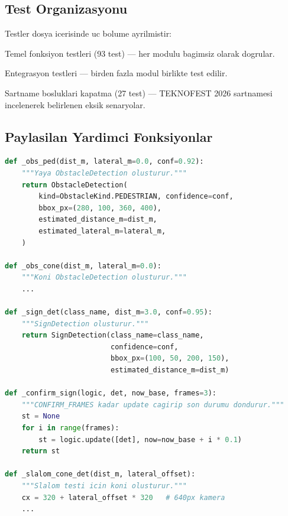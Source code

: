 \documentclass[a4paper,12pt]{article}
\begin{document}
\subsection{Test Organizasyonu}

Testler dosya icerisinde uc bolume ayrilmistir:

\begin{description}[leftmargin=2em]
  \item[Bolum 1] Temel fonksiyon testleri (93 test) ---
        her modulu bagimsiz olarak dogrular.
  \item[Bolum 2] Entegrasyon testleri ---
        birden fazla modul birlikte test edilir.
  \item[Bolum 3] Sartname bosluklari kapatma (27 test) ---
        TEKNOFEST 2026 sartnamesi incelenerek belirlenen eksik senaryolar.
\end{description}

\subsection{Paylasilan Yardimci Fonksiyonlar}

\begin{lstlisting}[language=Python, caption=Yardimci tespit yaraticilari]
def _obs_ped(dist_m, lateral_m=0.0, conf=0.92):
    """Yaya ObstacleDetection olusturur."""
    return ObstacleDetection(
        kind=ObstacleKind.PEDESTRIAN, confidence=conf,
        bbox_px=(280, 100, 360, 400),
        estimated_distance_m=dist_m,
        estimated_lateral_m=lateral_m,
    )

def _obs_cone(dist_m, lateral_m=0.0):
    """Koni ObstacleDetection olusturur."""
    ...

def _sign_det(class_name, dist_m=3.0, conf=0.95):
    """SignDetection olusturur."""
    return SignDetection(class_name=class_name,
                         confidence=conf,
                         bbox_px=(100, 50, 200, 150),
                         estimated_distance_m=dist_m)

def _confirm_sign(logic, det, now_base, frames=3):
    """CONFIRM_FRAMES kadar update cagirip son durumu dondurur."""
    st = None
    for i in range(frames):
        st = logic.update([det], now=now_base + i * 0.1)
    return st

def _slalom_cone_det(dist_m, lateral_offset):
    """Slalom testi icin koni olusturur."""
    cx = 320 + lateral_offset * 320   # 640px kamera
    ...
\end{lstlisting}
\end{document}
